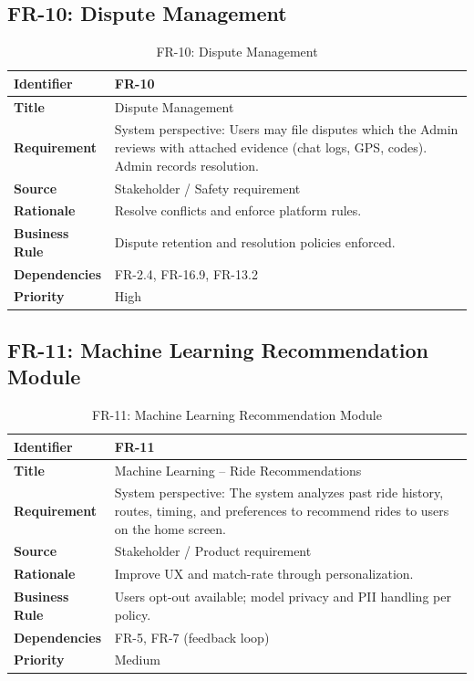 \subsection{FR-10: Dispute Management}

\begin{longtable}{|p{3cm}|p{12cm}|}
\caption{FR-10: Dispute Management}
\label{tab:fr-10} \\
\hline
\rowcolor{lightgray!30}
\textbf{Identifier} & FR-10 \\
\hline
\textbf{Title} & Dispute Management \\
\hline
\textbf{Requirement} & System perspective: Users may file disputes which the Admin reviews with attached evidence (chat logs, GPS, codes). Admin records resolution. \\
\hline
\textbf{Source} & Stakeholder / Safety requirement \\
\hline
\textbf{Rationale} & Resolve conflicts and enforce platform rules. \\
\hline
\textbf{Business Rule} & Dispute retention and resolution policies enforced. \\
\hline
\textbf{Dependencies} & FR-2.4, FR-16.9, FR-13.2 \\
\hline
\textbf{Priority} & High \\
\hline
\end{longtable}

\subsection{FR-11: Machine Learning Recommendation Module}

\begin{longtable}{|p{3cm}|p{12cm}|}
\caption{FR-11: Machine Learning Recommendation Module}
\label{tab:fr-11} \\
\hline
\rowcolor{lightgray!30}
\textbf{Identifier} & FR-11 \\
\hline
\textbf{Title} & Machine Learning – Ride Recommendations \\
\hline
\textbf{Requirement} & System perspective: The system analyzes past ride history, routes, timing, and preferences to recommend rides to users on the home screen. \\
\hline
\textbf{Source} & Stakeholder / Product requirement \\
\hline
\textbf{Rationale} & Improve UX and match-rate through personalization. \\
\hline
\textbf{Business Rule} & Users opt-out available; model privacy and PII handling per policy. \\
\hline
\textbf{Dependencies} & FR-5, FR-7 (feedback loop) \\
\hline
\textbf{Priority} & Medium \\
\hline
\end{longtable}

